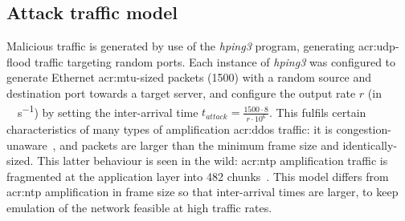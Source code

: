 \subsection{Attack traffic model}\label{sec:attack-traffic-model}
Malicious traffic is generated by use of the \emph{hping3} program, generating \gls{acr:udp}-flood traffic targeting random ports.
Each instance of \emph{hping3} was configured to generate Ethernet \gls{acr:mtu}-sized packets (\qty{1500}{\byte}) with a random source and destination port towards a target server, and configure the output rate $r$ (in \unit{\mega\bit\per\second}) by setting the inter-arrival time $t_{\mathit{attack}}=\frac{1500 \cdot 8}{r\cdot10^6}$.
This fulfils certain characteristics of many types of amplification \gls{acr:ddos} traffic: it is congestion-unaware~\parencite{DBLP:conf/ndss/Rossow14}, and packets are larger than the minimum frame size and identically-sized.
This latter behaviour is seen in the wild: \gls{acr:ntp} amplification traffic is fragmented at the application layer into \qty{482}{\byte} chunks~\parencite{cisco-ntp-amp}.
This model differs from \gls{acr:ntp} amplification in frame size so that inter-arrival times are larger, to keep emulation of the network feasible at high traffic rates.